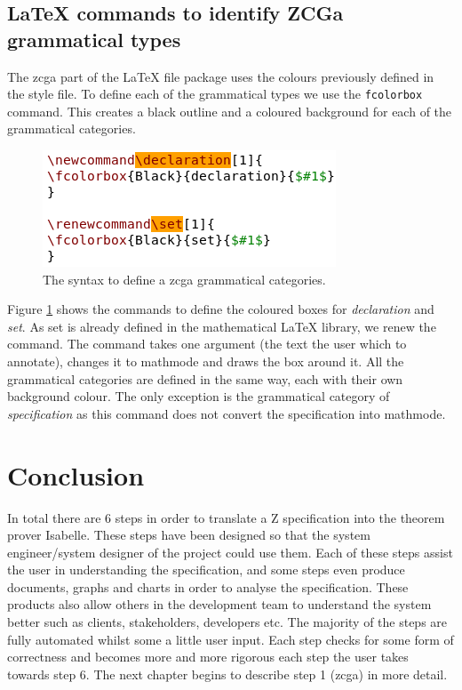 \subsection{\LaTeX{} commands to identify ZCGa grammatical types}

The \gls{zcga} part of the \LaTeX{} file package uses the colours previously
defined in the style file. To define each of the grammatical types we use the
\texttt{fcolorbox} command. This creates a black outline and a coloured
background for each of the grammatical categories.

\begin{figure}[H]
\includegraphics[scale=0.7]{Figures/Design/zmathe.png}
\caption{The syntax to define a \gls{zcga} grammatical categories. \label{fig:latexzcga}}
\end{figure}

Figure \ref{fig:latexzcga} shows the commands to define the coloured boxes for
\emph{declaration} and \emph{set}. As set is already defined in the mathematical
\LaTeX{} library, we renew the command. The command takes one argument (the text
the user which to annotate), changes it to mathmode and draws the box around it.
All the grammatical categories are defined in the same way, each with their own
background colour. The only exception is the grammatical category of
\emph{specification} as this command does not convert the specification into
mathmode.

\section{Conclusion}

In total there are 6 steps in order to translate a Z specification into the
theorem prover Isabelle. These steps have been designed so that the system
engineer/system designer of the project could use them.  Each of these steps
assist the user in understanding the specification, and some steps even produce
documents, graphs and charts in order to analyse the specification. These
products also allow others in the development team to understand the system
better such as clients, stakeholders, developers etc. The majority of the steps
are fully automated whilst some a little user input. Each step checks for some
form of correctness and becomes more and more rigorous each step the user takes
towards step 6. The next chapter begins to describe step 1 (\gls{zcga}) in more
detail.